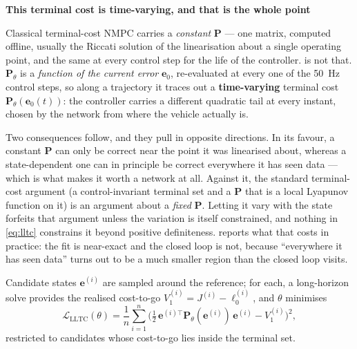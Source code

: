 \documentclass[11pt,a4paper,twoside,openright]{report}
\makeatletter
\renewcommand{\subsection}{\FloatBarrier\old@subsection}}
\renewcommand{\vec}[1]{\bm{#1}}
\newcommand{\mat}[1]{\bm{#1}}
\newcommand{\err}{\vec{e}}
\theoremstyle{plain}
\theoremstyle{definition}
\theoremstyle{remark}
\newcommand{\keyhead}[1]{\textbf{\sffamily\small\textcolor{NavyDeep}{#1}}\par\vspace{2pt}}
\makeatother
\begin{document}
	\begin{keybox}
		\keyhead{This terminal cost is time-varying, and that is the whole point}
		Classical terminal-cost NMPC carries a \emph{constant} $\mat P$ --- one
		matrix, computed offline, usually the Riccati solution of the linearisation
		about a single operating point, and the same at every control step for the
		life of the controller.  is not that. $\mat P_\theta$ is a
		\emph{function of the current error} $\err_0$, re-evaluated at every one of
		the \SI{50}{\hertz} control steps, so along a trajectory it traces out a
		\textbf{time-varying} terminal cost $\mat P_\theta(\err_0(t))$: the
		controller carries a different quadratic tail at every instant, chosen by
		the network from where the vehicle actually is.

		Two consequences follow, and they pull in opposite directions. In its
		favour, a constant $\mat P$ can only be correct near the point it was
		linearised about, whereas a state-dependent one can in principle be correct
		everywhere it has seen data --- which is what makes it worth a network at
		all. Against it, the standard terminal-cost argument (a control-invariant
		terminal set and a $\mat P$ that is a local Lyapunov function on it) is an
		argument about a \emph{fixed} $\mat P$. Letting it vary with the state
		forfeits that argument unless the variation is itself constrained, and
		nothing in \cref{eq:lltc} constrains it beyond positive definiteness.
		 reports what that costs in practice: the fit
		is near-exact and the closed loop is not, because ``everywhere it has seen
		data'' turns out to be a much smaller region than the closed loop visits.
	\end{keybox}

	\subsection{Training objective}

	Candidate states $\err^{(i)}$ are sampled around the reference; for each, a
	long-horizon solve provides the realised cost-to-go
	$V_1^{(i)}=J^{(i)}-\ell_0^{(i)}$, and $\theta$ minimises
	\begin{equation}
		\mathcal L_\mathrm{LLTC}(\theta)=\frac1n\sum_{i=1}^{n}
		\Big(\tfrac12\,\err^{(i)\top}\mat P_\theta(\err^{(i)})\,\err^{(i)}-V_1^{(i)}\Big)^{2},
		\label{eq:lltcloss}
	\end{equation}
	restricted to candidates whose cost-to-go lies inside the terminal set.
\end{document}
